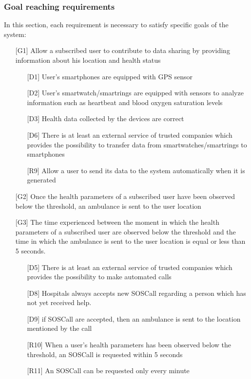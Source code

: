 \subsubsection{Goal reaching requirements}
\par
In this section, each requirement is necessary to satisfy specific goals of the system:
\begin{itemize}
\item[{[G1]}] Allow a subscribed user to contribute to data sharing by providing information about his location and health status
	\begin{itemize}
	\item[{[D1]}]  User's smartphones are equipped with GPS sensor
	\item[{[D2]}] User's smartwatch/smartrings are equipped with sensors to analyze information such as heartbeat and blood oxygen saturation levels
	\item[{[D3]}] Health data collected by the devices are correct
	\item[{[D6]}] There is at least an external service of trusted companies which provides the possibility to transfer data from smartwatches/smartrings to smartphones
	\item[{[R9]}] Allow a user to send its data to the system automatically when it is generated
	\end{itemize}
\item[{[G2]}] Once the health parameters of a subscribed user have been observed 
below the threshold, an ambulance is sent to the user location 
\item[{[G3]}] The time experienced between the moment in which the health parameters of a subscribed user are observed below the threshold and the time in which the ambulance is sent to the user location is equal or less than 5 seconds. 
	\begin{itemize}
	\item[{[D5]}] There is at least an external service of trusted companies which provides the possibility to make automated calls
	\item[{[D8]}] Hospitals always accepts new SOSCall regarding a person which has not yet received help.
	\item[{[D9]}] if SOSCall are accepted, then an ambulance is sent to the location mentioned by the call
	\item[{[R10]}] When a user's health parameters has been observed below the threshold, an SOSCall is requested within 5 seconds
	\item[{[R11]}] An SOSCall can be requested only every minute

\end{itemize}
\end{itemize}

